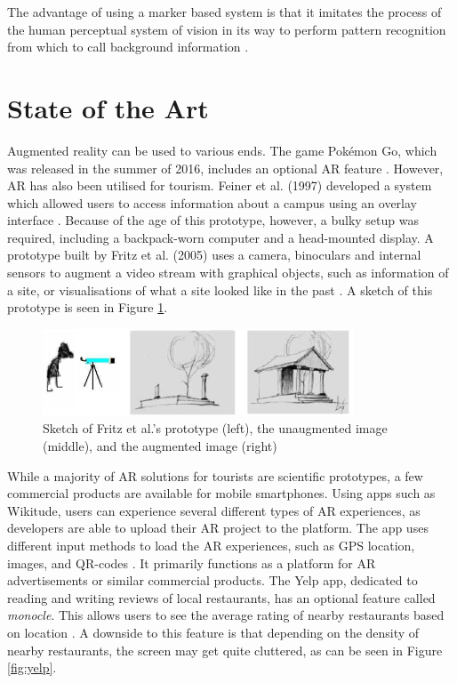 The advantage of using a marker based system is that it imitates the process of the human perceptual system of vision in its way to perform pattern recognition from which to call background information \cite{Woodford}.

\section{State of the Art}
Augmented reality can be used to various ends. The game Pokémon Go, which was released in the summer of 2016, includes an optional AR feature \cite{Pokemon}. However, AR has also been utilised for tourism. Feiner et al. (1997) developed a system which allowed users to access information about a campus using an overlay interface \cite{Feiner1997}. Because of the age of this prototype, however, a bulky setup was required, including a backpack-worn computer and a head-mounted display. A prototype built by Fritz et al. (2005) uses a camera, binoculars and internal sensors to augment a video stream with graphical objects, such as information of a site, or visualisations of what a site looked like in the past \cite{Fritz2005}. A sketch of this prototype is seen in Figure \ref{fig:binoculars}.

\begin{figure}[h!]
    \centering
    \includegraphics[scale=1]{figures/binoc.png}
    \caption{Sketch of Fritz et al.'s prototype (left), the unaugmented image (middle), and the augmented image (right) \cite{Fritz2005}}\label{fig:binoculars}
\end{figure}

While a majority of AR solutions for tourists are scientific prototypes, a few commercial products are available for mobile smartphones. Using apps such as Wikitude, users can experience several different types of AR experiences, as developers are able to upload their AR project to the platform. The app uses different input methods to load the AR experiences, such as GPS location, images, and QR-codes \cite{Wikitude}. It primarily functions as a platform for AR advertisements or similar commercial products. The Yelp app, dedicated to reading and writing reviews of local restaurants, has an optional feature called \textit{monocle}. This allows users to see the average rating of nearby restaurants based on location \cite{Yelp}. A downside to this feature is that depending on the density of nearby restaurants, the screen may get quite cluttered, as can be seen in Figure \ref{fig:yelp}.\pagebreak

